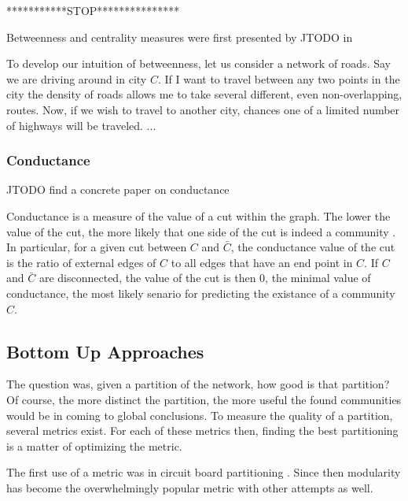 \documentclass[phd,tocprelim]{cornell}
\begin{document}
***********STOP***************

Betweenness and centrality measures were first presented by JTODO in \cite{JTODO}

To develop our intuition of betweenness, let us consider a network of roads.  Say we are driving around in city $C$.  If I want to travel between any two points in the city the density of roads allows me to take several different, even non-overlapping, routes.  Now, if we wish to travel to another city, chances one of a limited number of highways will be traveled. ...


\subsubsection{Conductance}

JTODO find a concrete paper on conductance

Conductance is a measure of the value of a cut within the graph.  The lower the value of the cut, the more likely that one side of the cut is indeed a community \cite{}.  In particular, for a given cut between $C$ and $\bar{C}$, the conductance value of the cut is the ratio of external edges of $C$ to all edges that have an end point in $C$.  If $C$ and $\bar{C}$ are disconnected, the value of the cut is then $0$, the minimal value of conductance, the most likely senario for predicting the existance of a community $C$.


\subsection{Bottom Up Approaches}



The question was, given a partition of the network, how good is that partition?  Of course, the more distinct the partition, the more useful the found communities would be in coming to global conclusions.  To measure the quality of a partition, several metrics exist.  For each of these metrics then, finding the best partitioning is a matter of optimizing the metric.

The first use of a metric was in circuit board partitioning \cite{}.  Since then modularity has become the overwhelmingly popular metric with other attempts as well.
\end{document}
